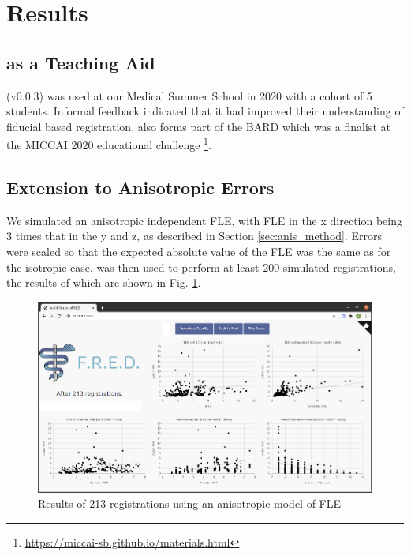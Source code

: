\section{Results}
\label{sec:results}
\subsection{\fred as a Teaching Aid}

\fred (v0.0.3)\cite{stephen_thompson_2020_3946090} was used at our Medical Summer School in 2020 with a cohort of 5 students. Informal feedback indicated that it had improved their
understanding
of fiducial based registration. \fred also forms part of the \gls{BARD} which 
was a finalist at the MICCAI 2020 educational challenge 
\footnote{\href{https://miccai-sb.github.io/materials.html}{https://miccai-sb.github.io/materials.html}}. 

\subsection{Extension to Anisotropic Errors}
We simulated an anisotropic independent \gls{FLE}, with \gls{FLE} in the x 
direction being 3 times that in the y and z, as described in Section \ref{sec:anis_method}.
Errors were scaled so that the 
expected absolute value of the \gls{FLE} was the same as for the isotropic case. 
\fred was then used to perform at least 200 simulated registrations, the results of
which are shown in Fig. \ref{fig:anis_error}. 

\begin{figure}
	\begin{center}
			\includegraphics[width=0.9\linewidth]{images/anisitropic_error.eps}
		\caption{\label{fig:anis_error}Results of 213 registrations using an anisotropic model of {FLE}}
	\end{center}
\end{figure}

